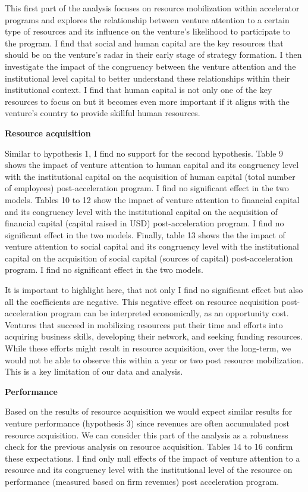\documentclass[
  english,
  man]{apa6}
\begin{document}
This first part of the analysis focuses on resource mobilization within accelerator programs and explores the relationship between venture attention to a certain type of resources and its influence on the venture's likelihood to participate to the program. I find that social and human capital are the key resources that should be on the venture's radar in their early stage of strategy formation. I then investigate the impact of the congruency between the venture attention and the institutional level capital to better understand these relationships within their institutional context. I find that human capital is not only one of the key resources to focus on but it becomes even more important if it aligns with the venture's country to provide skillful human resources.

\textbf{Resource acquisition}

Similar to hypothesis 1, I find no support for the second hypothesis. Table 9 shows the impact of venture attention to human capital and its congruency level with the institutional capital on the acquisition of human capital (total number of employees) post-acceleration program. I find no significant effect in the two models. Tables 10 to 12 show the impact of venture attention to financial capital and its congruency level with the institutional capital on the acquisition of financial capital (capital raised in USD) post-acceleration program. I find no significant effect in the two models. Finally, table 13 shows the the impact of venture attention to social capital and its congruency level with the institutional capital on the acquisition of social capital (sources of capital) post-acceleration program. I find no significant effect in the two models.

It is important to highlight here, that not only I find no significant effect but also all the coefficients are negative. This negative effect on resource acquisition post-acceleration program can be interpreted economically, as an opportunity cost. Ventures that succeed in mobilizing resources put their time and efforts into acquiring business skills, developing their network, and seeking funding resources. While these efforts might result in resource acquisition, over the long-term, we would not be able to observe this within a year or two post resource mobilization. This is a key limitation of our data and analysis.

\textbf{Performance}

Based on the results of resource acquisition we would expect similar results for venture performance (hypothesis 3) since revenues are often accumulated post resource acquisition. We can consider this part of the analysis as a robustness check for the previous analysis on resource acquisition. Tables 14 to 16 confirm these expectations. I find only null effects of the impact of venture attention to a resource and its congruency level with the institutional level of the resource on performance (measured based on firm revenues) post acceleration program.
\end{document}
